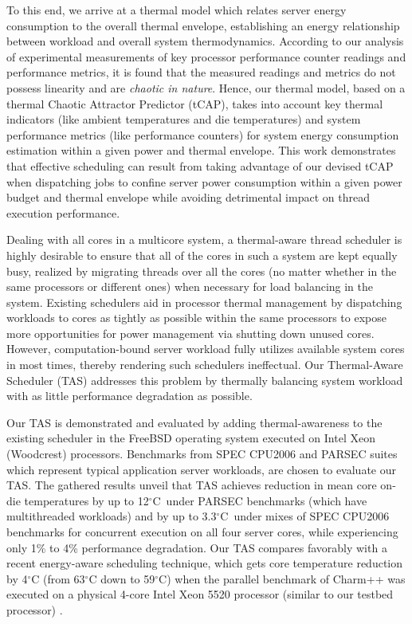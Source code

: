 \documentclass[times, 10pt,twocolumn]{IEEEtran}
\begin{document}
To this end, we arrive at a thermal model which relates server energy
consumption to the overall thermal envelope, establishing an energy
relationship between workload and overall system thermodynamics.
According to our analysis of experimental measurements of key processor
performance counter readings and performance metrics, it is found that
the measured readings and metrics do not possess linearity and are
\textit{chaotic in nature}.  Hence, our thermal model, based on a
thermal Chaotic Attractor Predictor (tCAP), takes into account key
thermal indicators (like ambient temperatures and die temperatures) and
system performance metrics (like performance counters) for system energy
consumption estimation within a given power and thermal envelope.  This
work demonstrates that effective scheduling can result from taking
advantage of our devised tCAP when dispatching jobs to confine server
power consumption within a given power budget and thermal envelope while
avoiding detrimental impact on thread execution performance.

Dealing with all cores in a multicore system, a thermal-aware thread
scheduler is highly desirable to ensure that all of the cores in such a
system are kept equally busy, realized by migrating threads over all the
cores (no matter whether in the same processors or different ones) when
necessary for load balancing in the system.  Existing schedulers aid in
processor thermal management by dispatching workloads to cores as
tightly as possible within the same processors to expose more
opportunities for power management via shutting down unused cores.
However, computation-bound server workload fully utilizes available
system cores in most times, thereby rendering such schedulers
ineffectual.  Our Thermal-Aware Scheduler (TAS) addresses this problem
by thermally balancing system workload with as little performance
degradation as possible.  

Our TAS is demonstrated and evaluated by adding
thermal-awareness to the existing scheduler in the FreeBSD operating
system executed on Intel Xeon (Woodcrest) processors.  Benchmarks from SPEC
CPU2006 and PARSEC suites which represent typical application
server workloads, are chosen to evaluate our TAS.
The gathered results unveil that TAS achieves reduction in mean core
on-die temperatures by up to 12$^{\circ}$C\ under PARSEC benchmarks 
(which have multithreaded workloads) and by up to 3.3$^{\circ}$C\ under mixes 
of SPEC CPU2006 benchmarks for concurrent execution on all four server cores, 
while experiencing only 1\% to 4\% performance degradation.
Our TAS compares favorably with a recent energy-aware scheduling technique, 
which gets core temperature reduction by 4$^\circ$C (from 63$^\circ$C down to 
59$^\circ$C) when the parallel benchmark of Charm++ was executed on a physical 4-core 
Intel Xeon 5520 processor (similar to our testbed processor) \cite{Sarood2011}.
\end{document}
